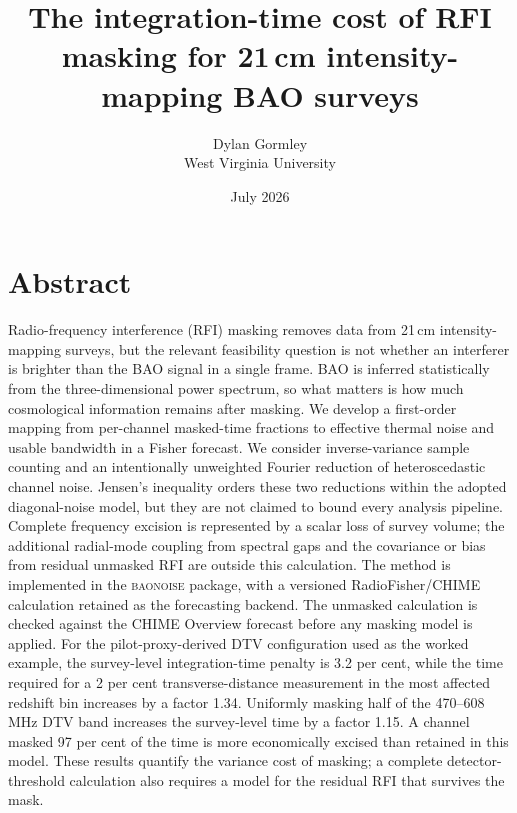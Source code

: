 \documentclass[10pt,twocolumn]{article}
\title{The integration-time cost of RFI masking for 21\,cm
intensity-mapping BAO surveys}
\author{Dylan Gormley \\ {\small West Virginia University}}
\date{July 2026}
\begin{document}
\maketitle

\section*{Abstract}

Radio-frequency interference (RFI) masking removes data from 21\,cm
intensity-mapping surveys, but the relevant feasibility question is not
whether an interferer is brighter than the BAO signal in a single frame.
BAO is inferred statistically from the three-dimensional power spectrum,
so what matters is how much cosmological information remains after
masking. We develop a first-order mapping from per-channel masked-time
fractions to effective thermal noise and usable bandwidth in a Fisher
forecast. We consider inverse-variance sample counting and an
intentionally unweighted Fourier reduction of heteroscedastic channel
noise. Jensen's inequality orders these two reductions within the
adopted diagonal-noise model, but they are not claimed to bound every
analysis pipeline. Complete frequency excision is represented by a
scalar loss of survey volume; the additional radial-mode coupling from
spectral gaps and the covariance or bias from residual unmasked RFI are
outside this calculation. The method is implemented in the
\textsc{baonoise} package, with a versioned RadioFisher/CHIME
calculation retained as the forecasting backend. The unmasked
calculation is checked against the CHIME Overview forecast before any
masking model is applied. For the pilot-proxy-derived DTV configuration
used as the worked example, the survey-level integration-time penalty is
3.2 per cent, while the time required for a 2 per cent
transverse-distance measurement in the most affected redshift bin
increases by a factor 1.34. Uniformly masking half of the
470--608\,MHz DTV band increases the survey-level time by a factor
1.15. A channel masked 97 per cent of the time is more economically
excised than retained in this model. These results quantify the
variance cost of masking; a complete detector-threshold calculation also
requires a model for the residual RFI that survives the mask.





\end{document}
